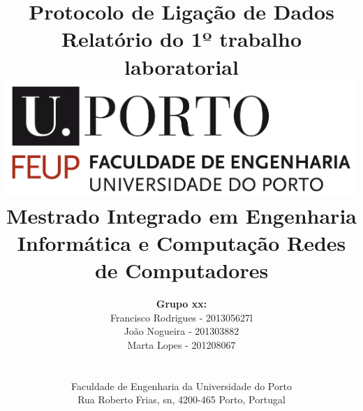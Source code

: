 \documentclass[11pt]{article}
\begin{document}
\setlength{\textwidth}{16cm}
\setlength{\textheight}{22cm}

\title{\Huge\textbf{Protocolo de Ligação de Dados}\linebreak\linebreak\linebreak
\Large\textbf{Relatório do 1º trabalho laboratorial}\linebreak
\linebreak\linebreak
\includegraphics[scale=0.1]{feup-logo.png}\linebreak
\linebreak\linebreak
\Large{Mestrado Integrado em Engenharia Informática e Computação} \linebreak\linebreak
\Large{Redes de Computadores}
}

\author{\textbf{Grupo xx:}\\
Francisco Rodrigues - 201305627l\\
João Nogueira - 201303882 \\
Marta Lopes - 201208067 \\
\linebreak\linebreak \\
 \\ Faculdade de Engenharia da Universidade do Porto \\ Rua Roberto Frias, s\/n, 4200-465 Porto, Portugal \linebreak\linebreak\linebreak
\linebreak\linebreak\vspace{1cm}}

\maketitle
\thispagestyle{empty}

\newpage
\tableofcontents
\newpage
\end{document}
